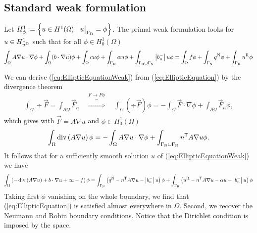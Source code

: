 \subsection{Standard weak formulation}\label{subsec:}
%
\begin{yellowbox}
Let $H^1_{\phi}:= \SetDef{u\in H^1(\Omega)}{\Rest{u}{\GammaD} = \phi}$. The primal weak formulation looks for 
$u\in H^1_{u^{\rm D}}$ such that for all $\phi\in H^1_{0}(\Omega)$
%
\begin{equation}\label{eq:EllipticEquationWeak}
\int_{\Omega} A\nabla u \cdot\nabla \phi 
+ \int_{\Omega}(b\cdot \nabla u)\phi
+ \int_{\Omega}cu\phi
+ \int_{\Gamma_{\rm R}} \alpha u \phi 
+ \int_{\Gamma_{\rm R}\cup\Gamma_{\rm N}} \left|b_n^-\right| u \phi
= \int_{\Omega} f \phi 
+  \int_{\Gamma_{\rm N}} q^{\rm N} \phi
+  \int_{\Gamma_{\rm R}} u^{\rm R} \phi
\end{equation}
\end{yellowbox}
%
We can derive (\ref{eq:EllipticEquationWeak}) from (\ref{eq:EllipticEquation}) by the divergence theorem
%
\begin{align*}
\int_{\Omega} \div\vec{F} = \int_{\partial\Omega} \vec{F}_n\quad\overbrace{\Longrightarrow}^{F\to F\phi}\quad 
\int_{\Omega} (\div\vec{F}) \phi = -\int_{\Omega} \vec{F}\cdot \nabla\phi + \int_{\partial\Omega} \vec{F}_n\phi,
\end{align*}
%
which gives with $\vec{F}=A\nabla u$ and $\phi\in H^1_{0}(\Omega)$
%
\begin{align*}
\int_{\Omega} \operatorname{div}\left(A\nabla u\right)\phi = 
- \int_{\Omega}A\nabla u\cdot\nabla\phi+ \int_{\Gamma_{\rm N}\cup\Gamma_{\rm R}} {n}^{\mathsf{T}}A\nabla u\phi.
\end{align*}
%
It follows that for a sufficiently smooth solution $u$ of (\ref{eq:EllipticEquationWeak}) we have
%
\begin{align*}
\int_{\Omega}\left( 
-\operatorname{div}\left(A\nabla u\right)+b\cdot\nabla u + c u - f \right)\phi = \int_{\Gamma_{\rm N}} \left( q^{\rm N}-{n}^{\mathsf{T}}A\nabla u-\left|b_n^-\right| u\right)\phi + \int_{\Gamma_{\rm R}} \left(u^{\rm R} -{n}^{\mathsf{T}}A\nabla u- \alpha u- \left|b_n^-\right| u\right)\phi
\end{align*}
%
Taking first $\phi$ vanishing on the whole boundary, we find that (\ref{eq:EllipticEquation}) is satisfied almost everywhere in $\Omega$. 
Second, we recover the Neumann and Robin boundary conditions. Notice that the Dirichlet condition is imposed by the space.

